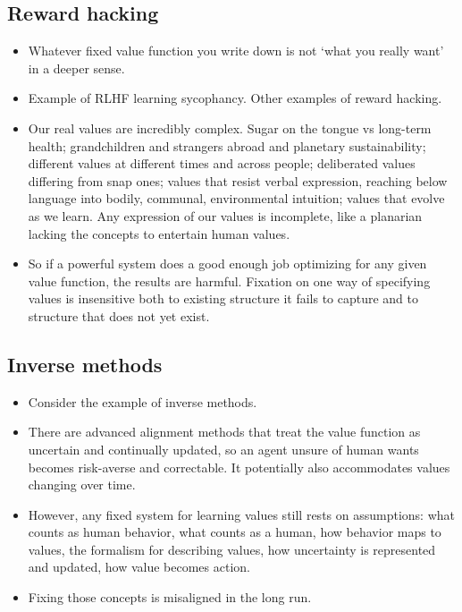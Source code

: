 \documentclass[11pt]{article}
\begin{document}
\subsection*{Reward hacking}

\begin{itemize}
  \item Whatever fixed value function you write down is not `what you really want' in a deeper sense.
  \item Example of RLHF learning sycophancy. Other examples of reward hacking.
  \item Our real values are incredibly complex. Sugar on the tongue vs long-term health; grandchildren and strangers abroad and planetary sustainability; different values at different times and across people; deliberated values differing from snap ones; values that resist verbal expression, reaching below language into bodily, communal, environmental intuition; values that evolve as we learn. Any expression of our values is incomplete, like a planarian lacking the concepts to entertain human values.
  \item So if a powerful system does a good enough job optimizing for any given value function, the results are harmful. Fixation on one way of specifying values is insensitive both to existing structure it fails to capture and to structure that does not yet exist.
\end{itemize}

\subsection*{Inverse methods}
\begin{itemize}
  \item Consider the example of inverse methods.
  \item There are advanced alignment methods that treat the value function as uncertain and continually updated, so an agent unsure of human wants becomes risk-averse and correctable. It potentially also accommodates values changing over time.
  \item However, any fixed system for learning values still rests on assumptions: what counts as human behavior, what counts as a human, how behavior maps to values, the formalism for describing values, how uncertainty is represented and updated, how value becomes action.
  \item Fixing those concepts is misaligned in the long run.
\end{itemize}
\end{document}
